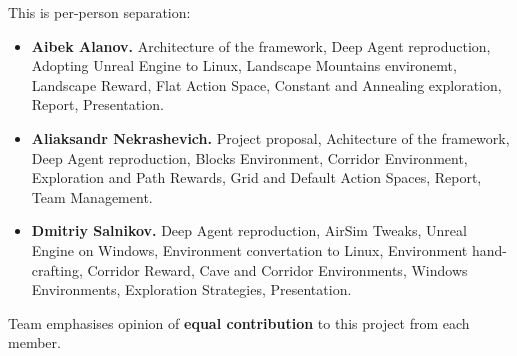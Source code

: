 \documentclass{article}
\begin{document}
This is per-person separation:

\begin{itemize}
    \item {\bf Aibek Alanov.} Architecture of the framework, Deep Agent reproduction,
        Adopting Unreal Engine to Linux, Landscape Mountains environemt,
        Landscape Reward, Flat Action Space, Constant and Annealing exploration, 
        Report, Presentation.

    \item {\bf Aliaksandr Nekrashevich.} Project proposal, Achitecture of 
        the framework, Deep Agent reproduction, Blocks Environment, 
        Corridor Environment, Exploration and Path Rewards, 
        Grid and Default Action Spaces, Report, Team Management.

    \item {\bf Dmitriy Salnikov.} Deep Agent reproduction, AirSim Tweaks,
        Unreal Engine on Windows, Environment convertation to Linux,
        Environment hand-crafting, Corridor Reward, Cave and Corridor 
        Environments, Windows Environments, Exploration Strategies, 
        Presentation.
\end{itemize}

Team emphasises opinion of {\bf equal contribution} to this project from 
each member.



\end{document}
